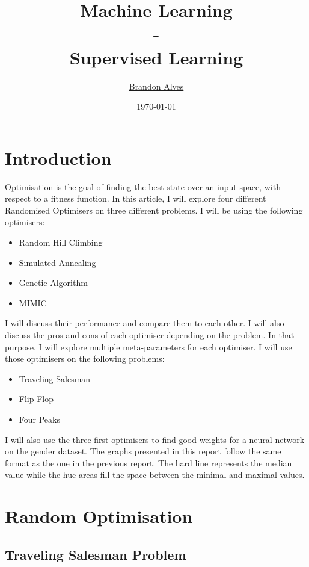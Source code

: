 \documentclass[twocolumn, 10pt]{article}
\title{
	Machine Learning
	\\-\\
	Supervised Learning
}
\author{
	\href{mailto:brandon.alves@gatech.edu}{Brandon Alves}
}
\date{\today}
\begin{document}
	\maketitle
	\thispagestyle{empty}
	\tableofcontents
	\section{Introduction}
		Optimisation is the goal of finding the best state over an input space, with respect to a fitness function. In this article, I will explore four different Randomised Optimisers on three different problems. I will be using the following optimisers:
		\begin{itemize}
			\item Random Hill Climbing
			\item Simulated Annealing
			\item Genetic Algorithm
			\item MIMIC
		\end{itemize}
		I will discuss their performance and compare them to each other. I will also discuss the pros and cons of each optimiser depending on the problem. In that purpose, I will explore multiple meta-parameters for each optimiser. I will use those optimisers on the following problems:
		\begin{itemize}
			\item Traveling Salesman
			\item Flip Flop
			\item Four Peaks
		\end{itemize}
		I will also use the three first optimisers to find good weights for a neural network on the gender dataset. The graphs presented in this report follow the same format as the one in the previous report. The hard line represents the median value while the hue areas fill the space between the minimal and maximal values.
	\section{Random Optimisation}
		\subsection{Traveling Salesman Problem}
\end{document}
